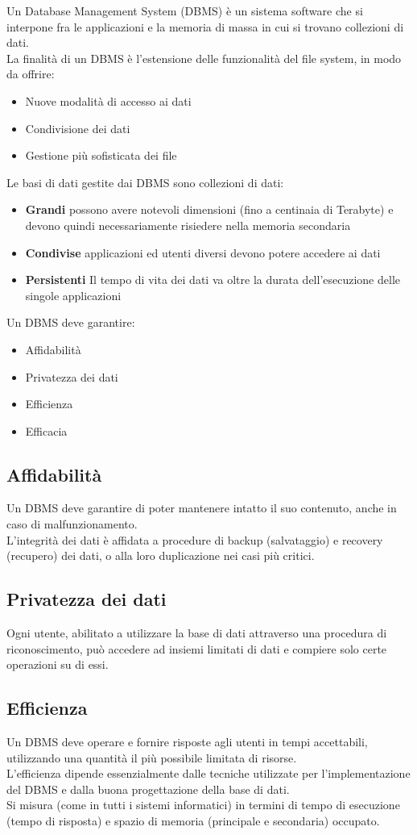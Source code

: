 \documentclass[../main.tex]{subfiles}
\begin{document}
	Un Database Management System (DBMS) è un sistema software che si interpone fra le applicazioni e la memoria di massa in cui si trovano collezioni di dati.\\
	La finalità di un DBMS è l’estensione delle funzionalità del file system, in modo da offrire:
	\begin{itemize}
		\item Nuove modalità di accesso ai dati
		\item Condivisione dei dati
		\item Gestione più sofisticata dei file
	\end{itemize}
	Le basi di dati gestite dai DBMS sono collezioni di dati:
	\begin{itemize}
		\item \textbf{Grandi} possono avere notevoli dimensioni (fino a centinaia di Terabyte) e devono quindi necessariamente risiedere nella memoria secondaria
		\item \textbf{Condivise} applicazioni ed utenti diversi devono potere accedere ai dati
		\item \textbf{Persistenti} Il tempo di vita dei dati va oltre la durata dell’esecuzione delle singole applicazioni
	\end{itemize}
	Un DBMS deve garantire:
	\begin{itemize}
		\item Affidabilità 
		\item Privatezza dei dati 
		\item Efficienza 
		\item Efficacia
	\end{itemize}
	\subsection{Affidabilità}
	Un DBMS deve garantire di poter mantenere intatto il suo contenuto, anche in caso di malfunzionamento.\\
	L’integrità dei dati è affidata a procedure di backup (salvataggio) e recovery (recupero) dei dati, o alla loro duplicazione nei casi più critici.
	\subsection{Privatezza dei dati}
	Ogni utente, abilitato a utilizzare la base di dati attraverso una procedura di riconoscimento, può accedere ad insiemi limitati di dati e compiere solo certe operazioni su di essi.
	\subsection{Efficienza}
	Un DBMS deve operare e fornire risposte agli utenti in tempi accettabili, utilizzando una quantità il più possibile limitata di risorse.\\
	L’efficienza dipende essenzialmente dalle tecniche utilizzate per l’implementazione del DBMS e dalla buona progettazione della base di dati.\\
	Si misura (come in tutti i sistemi informatici) in termini di tempo di esecuzione (tempo di risposta) e spazio di memoria (principale e secondaria) occupato.
\end{document}
